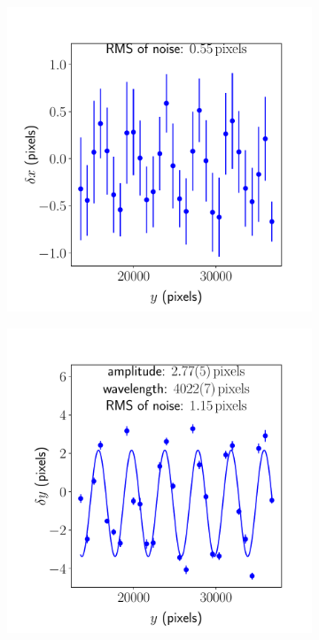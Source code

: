 \documentclass{article}
\begin{document}
\begin{figure}[ht]
\begin{subfigure}{0.24\linewidth}
		\caption{}
		\label{fig:sinewave2yxJHUPolaris}
	\end{subfigure}
	\begin{subfigure}{0.24\linewidth}
		\includegraphics[width=\linewidth]{sine-wave-2-xy-JHUPolaris.pdf}
		\caption{}
		\label{fig:sinewave2xyJHUPolaris}
	\end{subfigure}
	\begin{subfigure}{0.24\linewidth}
		\includegraphics[width=\linewidth]{sine-wave-2-yy-JHUPolaris.pdf}

\end{subfigure}
\end{figure}
\end{document}

